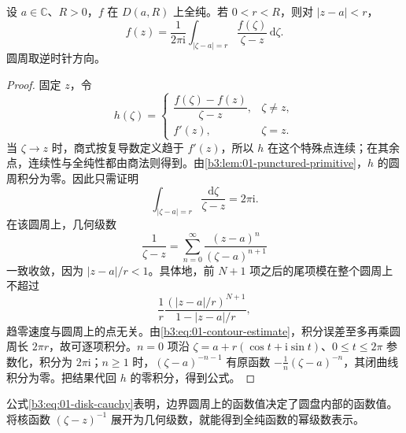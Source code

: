\begin{lemma}\label{b3:lem:01-disk-cauchy}
设 \(a\in\mathbb C\)、\(R>0\)，\(f\) 在 \(D(a,R)\) 上全纯。若 \(0<r<R\)，则对 \(|z-a|<r\)，
\begin{equation}\label{b3:eq:01-disk-cauchy}
f(z)=\frac1{2\pi\mathrm{i}}\int_{|\zeta-a|=r}
\frac{f(\zeta)}{\zeta-z}\,\mathrm{d}\zeta.
\end{equation}
圆周取逆时针方向。
\end{lemma}
\begin{proof}
固定 \(z\)，令
\[
h(\zeta)=\begin{cases}
\dfrac{f(\zeta)-f(z)}{\zeta-z},&\zeta\neq z,\\[4pt]
f'(z),&\zeta=z.
\end{cases}
\]
当 \(\zeta\to z\) 时，商式按复导数定义趋于 \(f'(z)\)，所以 \(h\) 在这个特殊点连续；在其余点，连续性与全纯性都由商法则得到。由\cref{b3:lem:01-punctured-primitive}，\(h\) 的圆周积分为零。因此只需证明
\[
\int_{|\zeta-a|=r}\frac{\mathrm{d}\zeta}{\zeta-z}=2\pi\mathrm{i}.
\]
在该圆周上，几何级数
\[
\frac1{\zeta-z}=\sum_{n=0}^\infty
\frac{(z-a)^n}{(\zeta-a)^{n+1}}
\]
一致收敛，因为 \(|z-a|/r<1\)。具体地，前 \(N+1\) 项之后的尾项模在整个圆周上不超过
\[
 \frac1r\frac{(|z-a|/r)^{N+1}}{1-|z-a|/r},
\]
趋零速度与圆周上的点无关。由\eqref{b3:eq:01-contour-estimate}，积分误差至多再乘圆周长 \(2\pi r\)，故可逐项积分。\(n=0\) 项沿 \(\zeta=a+r(\cos t+\mathrm{i}\sin t)\)、\(0\leq t\leq2\pi\) 参数化，积分为 \(2\pi\mathrm{i}\)；\(n\geq1\) 时，\((\zeta-a)^{-n-1}\) 有原函数 \(-\frac1n(\zeta-a)^{-n}\)，其闭曲线积分为零。把结果代回 \(h\) 的零积分，得到公式。
\end{proof}

公式\eqref{b3:eq:01-disk-cauchy}表明，边界圆周上的函数值决定了圆盘内部的函数值。将核函数 \((\zeta-z)^{-1}\) 展开为几何级数，就能得到全纯函数的幂级数表示。

